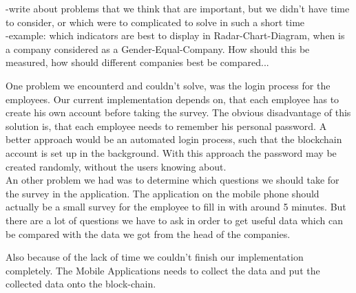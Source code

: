-write about problems that we think that are important, but we didn't have time to consider, or which were to complicated to solve in such a short time\\
-example: which indicators are best to display in Radar-Chart-Diagram, when is a company considered as a Gender-Equal-Company. How should this be measured, how should different companies best be compared...

One problem we encounterd and couldn't solve, was the login process for the employees. Our current implementation depends on, that each employee has to create his own account before taking the survey.
The obvious disadvantage of this solution is, that each employee needs to remember his personal password. A better approach would be an automated login process, such that the blockchain account is set up in the
background. With this approach the password may be created randomly, without the users knowing about.\\

An other problem we had was to determine which questions we should take for the survey in the application. The application on the mobile phone should actually be a small survey for the employee to fill in with around 5 minutes. But there are a lot of questions we have to ask in order to get useful data which can be compared with the data we got from the head of the companies. 

Also because of the lack of time we couldn't finish our implementation completely. The Mobile Applications needs to collect the data and put the collected data onto the block-chain.

   
\begin{comment}   
And because all the data is digitally available, we could also insert classification via artificial intelligence to even further improve the evaluation process.
\end{comment}
    
